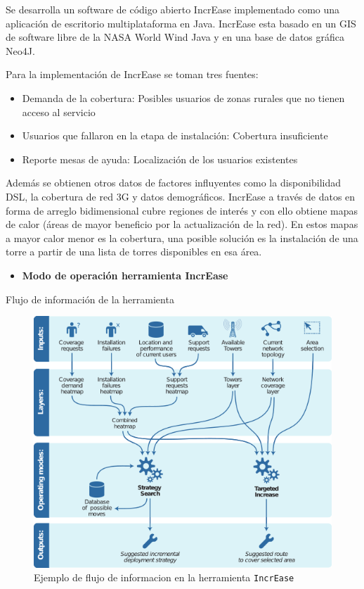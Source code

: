 \documentclass[]{article}
\providecommand{\tightlist}{%
  \setlength{\itemsep}{0pt}\setlength{\parskip}{0pt}}
\begin{document}
Se desarrolla un software de código abierto IncrEase implementado como
una aplicación de escritorio multiplataforma en Java. IncrEase esta
basado en un GIS de software libre de la NASA World Wind Java y en una
base de datos gráfica Neo4J.

Para la implementación de IncrEase se toman tres fuentes:

\begin{itemize}
\tightlist
\item
  Demanda de la cobertura: Posibles usuarios de zonas rurales que no
  tienen acceso al servicio
\item
  Usuarios que fallaron en la etapa de instalación: Cobertura
  insuficiente
\item
  Reporte mesas de ayuda: Localización de los usuarios existentes
\end{itemize}

Además se obtienen otros datos de factores influyentes como la
disponibilidad DSL, la cobertura de red 3G y datos demográficos.
IncrEase a través de datos en forma de arreglo bidimensional cubre
regiones de interés y con ello obtiene mapas de calor (áreas de mayor
beneficio por la actualización de la red). En estos mapas a mayor calor
menor es la cobertura, una posible solución es la instalación de una
torre a partir de una lista de torres disponibles en esa área.

\begin{itemize}
\tightlist
\item
  \textbf{Modo de operación herramienta IncrEase}
\end{itemize}

Flujo de información de la herramienta

\begin{figure}
\centering
\includegraphics{figure4_1.png}
\caption{Ejemplo de flujo de informacion en la herramienta
\texttt{IncrEase}}
\end{figure}
\end{document}
